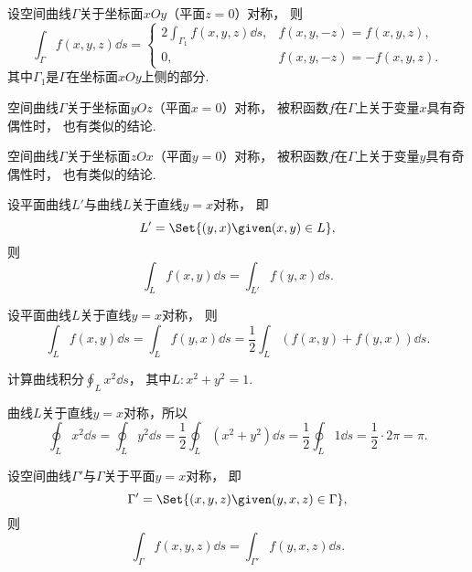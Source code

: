 设空间曲线\(\Gamma\)关于坐标面\(xOy\)（平面\(z=0\)）对称，
则\begin{equation*}
	\int_\Gamma f(x,y,z) \dd{s}
	= \left\{ \begin{array}{cc}
		2 \int_{\Gamma_1} f(x,y,z) \dd{s}, & f(x,y,-z) = f(x,y,z), \\
		0, & f(x,y,-z) = -f(x,y,z).
	\end{array} \right.
\end{equation*}
其中\(\Gamma_1\)是\(\Gamma\)在坐标面\(xOy\)上侧的部分.

空间曲线\(\Gamma\)关于坐标面\(yOz\)（平面\(x=0\)）对称，
被积函数\(f\)在\(\Gamma\)上关于变量\(x\)具有奇偶性时，
也有类似的结论.

空间曲线\(\Gamma\)关于坐标面\(zOx\)（平面\(y=0\)）对称，
被积函数\(f\)在\(\Gamma\)上关于变量\(y\)具有奇偶性时，
也有类似的结论.


设平面曲线\(L'\)与曲线\(L\)关于直线\(y=x\)对称，
即\begin{equation*}
	L' = \Set{ (y,x) \given (x,y) \in L },
\end{equation*}
则\begin{equation*}
	\int_L f(x,y) \dd{s}
	= \int_{L'} f(y,x) \dd{s}.
\end{equation*}

设平面曲线\(L\)关于直线\(y=x\)对称，
则\begin{equation*}
	\int_L f(x,y) \dd{s}
	= \int_L f(y,x) \dd{s}
	= \frac12 \int_L (f(x,y) + f(y,x)) \dd{s}.
\end{equation*}

\begin{example}
计算曲线积分\(\oint_L x^2 \dd{s}\)，
其中\(L: x^2+y^2=1\).
\begin{solution}
曲线\(L\)关于直线\(y=x\)对称，所以\begin{equation*}
	\oint_L x^2 \dd{s}
	= \oint_L y^2 \dd{s}
	= \frac12 \oint_L (x^2+y^2) \dd{s}
	= \frac12 \oint_L 1 \dd{s}
	= \frac12 \cdot 2\pi
	= \pi.
\end{equation*}
\end{solution}
\end{example}

设空间曲线\(\Gamma'\)与\(\Gamma\)关于平面\(y=x\)对称，
即\begin{equation*}
	\Gamma' = \Set{ (x,y,z) \given (y,x,z) \in \Gamma },
\end{equation*}
则\begin{equation*}
	\int_\Gamma f(x,y,z) \dd{s}
	= \int_{\Gamma'} f(y,x,z) \dd{s}.
\end{equation*}

